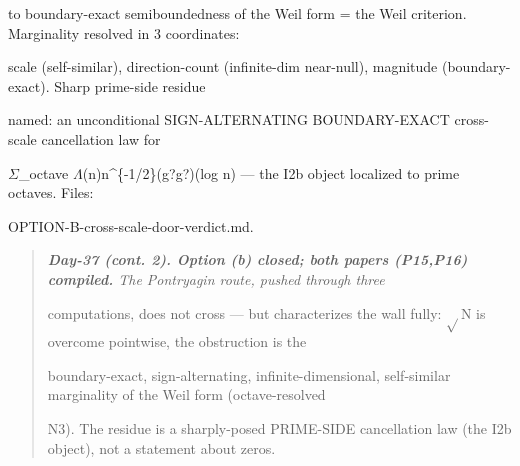 \documentclass[10pt]{article}
\begin{document}
  to boundary-exact semiboundedness of the Weil form = the Weil criterion. Marginality resolved in 3 coordinates:\par
  scale (self-similar), direction-count (infinite-dim near-null), magnitude (boundary-exact). Sharp prime-side residue\par
  named: an unconditional SIGN-ALTERNATING BOUNDARY-EXACT cross-scale cancellation law for\par
  \ensuremath{\Sigma}\_octave \ensuremath{\Lambda}(n)n\textasciicircum{}\{-1/2\}(g?g?)(log n) --- the I2b object localized to prime octaves. Files:\par
  OPTION-B-cross-scale-door-verdict.md.\par

\begin{quote}\itshape
\textbf{Day-37 (cont. 2). Option (b) closed; both papers (P15,P16) compiled.} The Pontryagin route, pushed through three\par
computations, does not cross --- but characterizes the wall fully: \ensuremath{\sqrt{}}N is overcome pointwise, the obstruction is the\par
boundary-exact, sign-alternating, infinite-dimensional, self-similar marginality of the Weil form (octave-resolved\par
N3). The residue is a sharply-posed PRIME-SIDE cancellation law (the I2b object), not a statement about zeros.\par
\end{quote}
\end{document}

